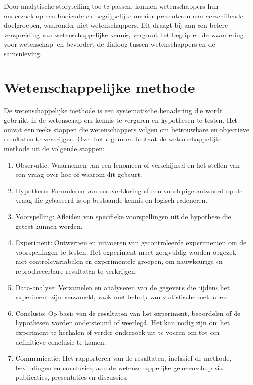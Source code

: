 \documentclass[
  letterpaper,
  DIV=11,
  numbers=noendperiod]{scrreprt}
\providecommand{\tightlist}{%
  \setlength{\itemsep}{0pt}\setlength{\parskip}{0pt}}\usepackage{longtable,booktabs,array}
\begin{document}
Door analytische storytelling toe te passen, kunnen wetenschappers hun
onderzoek op een boeiende en begrijpelijke manier presenteren aan
verschillende doelgroepen, waaronder niet-wetenschappers. Dit draagt bij
aan een betere verspreiding van wetenschappelijke kennis, vergroot het
begrip en de waardering voor wetenschap, en bevordert de dialoog tussen
wetenschappers en de samenleving.


\hypertarget{wetenschappelijke-methode-1}{%
\chapter{Wetenschappelijke methode}\label{wetenschappelijke-methode-1}}

De wetenschappelijke methode is een systematische benadering die wordt
gebruikt in de wetenschap om kennis te vergaren en hypothesen te testen.
Het omvat een reeks stappen die wetenschappers volgen om betrouwbare en
objectieve resultaten te verkrijgen. Over het algemeen bestaat de
wetenschappelijke methode uit de volgende stappen:

\begin{enumerate}
\def\labelenumi{\arabic{enumi}.}
\tightlist
\item
  Observatie: Waarnemen van een fenomeen of verschijnsel en het stellen
  van een vraag over hoe of waarom dit gebeurt.
\item
  Hypothese: Formuleren van een verklaring of een voorlopige antwoord op
  de vraag die gebaseerd is op bestaande kennis en logisch redeneren.
\item
  Voorspelling: Afleiden van specifieke voorspellingen uit de hypothese
  die getest kunnen worden.
\item
  Experiment: Ontwerpen en uitvoeren van gecontroleerde experimenten om
  de voorspellingen te testen. Het experiment moet zorgvuldig worden
  opgezet, met controlevariabelen en experimentele groepen, om
  nauwkeurige en reproduceerbare resultaten te verkrijgen.
\item
  Data-analyse: Verzamelen en analyseren van de gegevens die tijdens het
  experiment zijn verzameld, vaak met behulp van statistische methoden.
\item
  Conclusie: Op basis van de resultaten van het experiment, beoordelen
  of de hypothesen worden ondersteund of weerlegd. Het kan nodig zijn om
  het experiment te herhalen of verder onderzoek uit te voeren om tot
  een definitieve conclusie te komen.
\item
  Communicatie: Het rapporteren van de resultaten, inclusief de methode,
  bevindingen en conclusies, aan de wetenschappelijke gemeenschap via
  publicaties, presentaties en discussies.
\end{enumerate}
\end{document}
